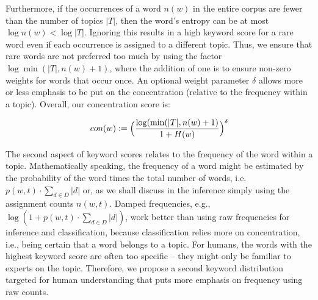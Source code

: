 \documentclass[twocolumn,10]{article}
\begin{document}
	Furthermore, if the occurrences of a word $n(w)$ in the entire corpus are fewer than the number of topics $|T|$, then the word's entropy can be at most $\log n(w) < \log |T|$. Ignoring this results in a high keyword score for a rare word even if each occurrence is assigned to a different topic. Thus, we ensure that rare words are not preferred too much by using the factor $\log \min(|T|,n(w)+1)$, where the addition of one is to ensure non-zero weights for words that occur once. An optional weight parameter $\delta$ allows more or less emphasis to be put on the concentration (relative to the frequency within a topic). Overall, our concentration score is: 
	\begin{small}
		\begin{equation} \begin{aligned}
		\vspace{-2pt}
		con(w):=\Big(\dfrac{\log(\min(|T|,n(w)+1)}{1+H(w)}\Big)^{\delta}
		\vspace{-2pt}
		\end{aligned}   \end{equation} \label{sec:ent}
	\end{small}
	\noindent The second aspect of keyword scores relates to the frequency of the word within a topic. Mathematically speaking, the frequency of a word might be estimated by the probability of the word times the total number of words, i.e.  $p(w,t)\cdot \sum_{d\in D}|d|$ or, as we shall discuss in the inference simply using the assignment counts $n(w,t)$.
	Damped frequencies, e.g., $\log (1 + p(w,t)\cdot \sum_{d\in D}|d|)$, work better than using raw frequencies for inference and classification, because classification relies more on concentration, i.e., being certain that a word belongs to a topic. For humans, the words with the highest keyword score are often too specific -- they might only be familiar to experts on the topic. Therefore, we propose a second keyword distribution targeted for human understanding that puts more emphasis on frequency using raw counts.	
\end{document}
